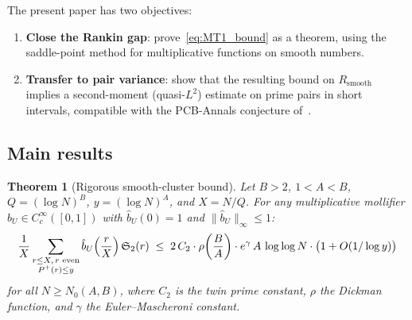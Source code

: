 \documentclass[11pt,reqno]{amsart}
\theoremstyle{plain}
\newtheorem{theorem}{Theorem}[section]
\theoremstyle{definition}
\theoremstyle{remark}
\newcommand{\Rsmooth}{R_{\mathrm{smooth}}}
\newcommand{\Sfrak}{\mathfrak{S}_2}
\newcommand{\Pplus}{P^{+}}
\begin{document}
The present paper has two objectives:
\begin{enumerate}[label=(\roman*),nosep]
  \item \textbf{Close the Rankin gap}: prove~\eqref{eq:MT1_bound}
    as a theorem, using the saddle-point method for multiplicative
    functions on smooth numbers.
  \item \textbf{Transfer to pair variance}: show that the resulting
    bound on $\Rsmooth$ implies a second-moment (quasi-$L^2$) estimate
    on prime pairs in short intervals, compatible with the PCB-Annals
    conjecture of~\cite{G37}.
\end{enumerate}

\subsection{Main results}

\begin{theorem}[Rigorous smooth-cluster bound]\label{thm:A}
Let $B > 2$, $1 < A < B$, $Q = (\log N)^B$, $y = (\log N)^A$,
and $X = N/Q$. For any multiplicative mollifier
$\hat{b}_U \in C_c^{\infty}([0,1])$ with $\hat{b}_U(0) = 1$
and $\|\hat{b}_U\|_{\infty} \le 1$:
\[
  \frac{1}{X} \sum_{\substack{r \le X,\, r \textup{ even} \\
  \Pplus(r) \le y}}
  \hat{b}_U\!\left(\frac{r}{X}\right) \Sfrak(r)
  \;\le\;
  2\,C_2 \cdot \rho\!\left(\frac{B}{A}\right)
  \cdot e^{\gamma}\, A\, \log\log N
  \cdot \bigl(1 + O(1/\log y)\bigr)
\]
for all $N \ge N_0(A,B)$, where $C_2$ is the twin prime constant,
$\rho$ the Dickman function, and $\gamma$ the Euler--Mascheroni
constant.
\end{theorem}
\end{document}
